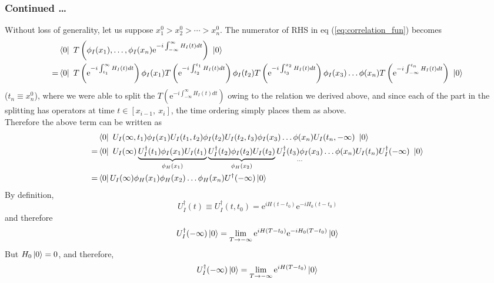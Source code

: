 \documentclass[11pt]{article}
\newcommand{\e}{\mathrm{e}}
\numberwithin{equation}{section}
\begin{document}
\subsubsection{Continued \ldots}

Without loss of generality, let us suppose \(x_1^0 > x_2^0 > \cdots > x_n^0\). The numerator of RHS in eq (\ref{eq:correlation_fun}) becomes 
\begin{align*}
    &\bra{0} ~T\left( \phi_I(x_1),\ldots,\phi_I(x_n)  \e^{-i\int_{-\infty}^{\infty}H_I(t)dt}\right)~ \ket{0} \\
    =&\bra{0} ~T\left( \e^{-i\int_{t_1}^{\infty}H_I(t)dt}\right) \phi_I(x_1)T\left( \e^{-i\int_{t_2}^{t_1}H_I(t)dt}\right)\phi_I(t_2)T\left( \e^{-i\int_{t_3}^{x_2}H_I(t)dt}\right)\phi_I(x_3) \ldots \phi(x_n)T\left( \e^{-i\int_{-\infty}^{t_n}H_I(t)dt}\right)~ \ket{0} 
\end{align*}
(\(t_n \equiv x_n^0\)), where we were able to split the \(T\left( \e^{-i\int_{-\infty}^{\infty}H_I(t)dt}\right)\) owing to the relation we derived above, and since each of the part in the splitting has operators at time \(t\in [x_{i-1},~x_i]\), the time ordering simply places them as above.\\
Therefore the above term can be written as 
\begin{align*}
    & \bra{0} ~U_I(\infty, t_1) \phi_I(x_1)U_I(t_1, t_2)\phi_I(t_2)U_I(t_2, t_3)\phi_I(x_3) \ldots \phi(x_n) U_I(t_n, -\infty)~ \ket{0} \\
    =&\bra{0} ~U_I(\infty)\underbrace{U_I^\dagger(t_1) \phi_I(x_1)U_I(t_1)}_{\phi_H(x_1)}\underbrace{U_I^\dagger(t_2)\phi_I(t_2)U_I(t_2)}_{\phi_H(x_2)} \underset{\ldots}{U_I^\dagger(t_3)\phi_I(x_3)} \ldots \phi(x_n) U_I(t_n)U_I^\dagger(-\infty)~ \ket{0}\\
    = & \bra{0} U_I(\infty) \phi_H(x_1) \phi_H(x_2) \ldots \phi_H(x_n) U^\dagger(-\infty)\ket{0}
\end{align*}
By definition, 
\begin{equation*}
    U_I^\dagger(t) \equiv U_I^\dagger(t, t_0) = \e^{iH(t - t_0)}\e^{-iH_0(t-t_0)} 
\end{equation*}
and therefore 
\begin{equation*}
    U_I^\dagger (-\infty)\ket{0} = \lim_{T\to -\infty} \e^{iH(T-t_0)}\e^{-iH_0(T-t_0)}\ket{0}
\end{equation*}
But \(H_0\ket{0} = 0\), and therefore, 
\begin{equation*}
    U_I^\dagger (-\infty)\ket{0} = \lim_{T\to -\infty} \e^{iH(T-t_0)}\ket{0}
\end{equation*}
\end{document}
